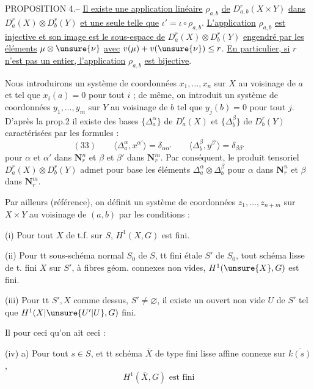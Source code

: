 PROPOSITION 4.-- \uline{Il existe une application linéaire} $\rho_{a,b}$ \uline{de} $D_{a,b}^r(X\times Y)$ \uline{dans} $D_a^r(X)\otimes D_b^r(Y)$ \uline{et une seule telle que} $\iota'=\iota\circ\rho_{a,b}$. \uline{L'application} $\rho_{a,b}$ \uline{est injective et son image est le sous-espace de} $D_a^r(X)\otimes D_b^r(Y)$ \uline{engendré par les éléments} $\mu\otimes\unsure{\nu}$ \uline{avec} $v(\mu)+v(\unsure{\nu})\leq r$. \uline{En particulier, si} $r$ \uline{n'est pas un entier, l'application} $\rho_{a,b}$ \uline{est bijective}.

Nous introduirons un système de coordonnées $x_1,\ldots,x_n$ sur $X$ au voisinage de $a$ et tel que $x_i(a)=0$ pour tout $i$ ; de même, on introduit un système de coordonnées $y_1,\ldots,y_m$ sur $Y$ au voisinage de $b$ tel que $y_j(b)=0$ pour tout $j$. D'après la prop.2 il existe des bases $\{\Delta_a^\alpha\}$ de $D_a^r(X)$ et $\{\Delta_b^\beta\}$ de $D_b^r(Y)$ caractérisées par les formules :
\[
(33)\qquad
\langle\Delta_a^\alpha,x^{\alpha'}\rangle=\delta_{\alpha\alpha'}
\qquad
\langle\Delta_b^\beta,y^{\beta'}\rangle=\delta_{\beta\beta'}
\]
pour $\alpha$ et $\alpha'$ dans $\mathbf{N}_r^n$ et $\beta$ et $\beta'$ dans $\mathbf{N}_r^m$. Par conséquent, le produit tensoriel $D_a^r(X)\otimes D_b^r(Y)$ admet pour base les éléments $\Delta_a^\alpha\otimes\Delta_b^\beta$ pour $\alpha$ dans $\mathbf{N}_r^n$ et $\beta$ dans $\mathbf{N}_r^m$.

Par ailleurs (référence), on définit un système de coordonnées $z_1,\ldots,z_{n+m}$ sur $X\times Y$ au voisinage de $(a,b)$ par les conditions :

(i) Pour tout $X$ de t.f. sur $S$, $H^1(X,G)$ est fini.

(ii) Pour tt sous-schéma  normal
$S_0$ de $S$,  tt  fini étale
$S'$ de $S_0$, tout schéma  lisse de t. fini $X$ sur $S'$, à fibres géom. connexes non vides, $H^1(\unsure{X},G)$ est fini.

(iii) Pour tt $S',X$ comme dessus, $S'\neq\varnothing$, il existe un ouvert non vide $U$ de $S'$ tel que $H^1(X|\unsure{U'|U},G)$  fini.

Il  pour ceci qu'on ait ceci :

(iv) a) Pour tout $s\in S$, et tt schéma $\bar X$ de type fini lisse affine connexe sur $\overline{k(s)}$,
\[
H^1(\bar X,G)\text{ est fini}
\]

